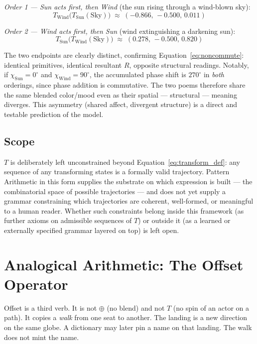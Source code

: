 \documentclass[12pt, a4paper]{article}
\begin{document}
\emph{Order 1 --- Sun acts first, then Wind} (the sun rising through a
wind-blown sky):
\begin{equation}
    T_{\text{Wind}}\big(T_{\text{Sun}}(\text{Sky})\big) \;\approx\; (-0.866,\, -0.500,\, 0.011)
\end{equation}

\emph{Order 2 --- Wind acts first, then Sun} (wind extinguishing a
darkening sun):
\begin{equation}
    T_{\text{Sun}}\big(T_{\text{Wind}}(\text{Sky})\big) \;\approx\; (0.278,\, -0.500,\, 0.820)
\end{equation}

The two endpoints are clearly distinct, confirming
Equation~\eqref{eq:noncommute}: identical primitives, identical
resultant $R$, opposite structural readings. Notably, if $\chi_{\text{Sun}}
= 0^\circ$ and $\chi_{\text{Wind}} = 90^\circ$, the accumulated phase
shift is $270^\circ$ in \emph{both} orderings, since phase addition is
commutative. The two poems therefore share the same blended color/mood
even as their spatial --- structural --- meaning diverges. This
asymmetry (shared affect, divergent structure) is a direct and
testable prediction of the model.

\subsection{Scope}
\label{subsec:transform_scope}
$T$ is deliberately left unconstrained beyond
Equation~\eqref{eq:transform_def}: any sequence of any transforming
states is a formally valid trajectory. Pattern Arithmetic in this form
supplies the substrate on which expression is built --- the
combinatorial space of possible trajectories --- and does not yet
supply a grammar constraining which trajectories are coherent,
well-formed, or meaningful to a human reader. Whether such constraints
belong inside this framework (as further axioms on admissible
sequences of $T$) or outside it (as a learned or externally specified
grammar layered on top) is left open.

\section{Analogical Arithmetic: The Offset Operator}
\label{sec:analogical_offset}

Offset is a third verb. It is not $\oplus$ (no blend) and not $T$
(no spin of an actor on a path). It copies a \emph{walk} from one
seat to another. The landing is a new direction on the same globe.
A dictionary may later pin a name on that landing. The walk does
not mint the name.
\end{document}
